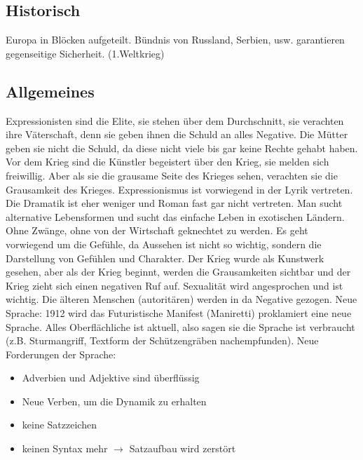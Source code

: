 \documentclass[12pt,a4paper]{article}
\begin{document}
\subsection{Historisch}

Europa in Blöcken aufgeteilt. Bündnis von Russland, Serbien, usw. garantieren gegenseitige Sicherheit. (1.Weltkrieg)

\subsection{Allgemeines}

Expressionisten sind die Elite, sie stehen über dem Durchschnitt, sie verachten ihre Väterschaft, denn sie geben ihnen die Schuld an alles Negative. Die Mütter geben sie nicht die Schuld, da diese nicht viele bis gar keine Rechte gehabt haben. 
\newline
Vor dem Krieg sind die Künstler begeistert über den Krieg, sie melden sich freiwillig. Aber als sie die grausame Seite des Krieges sehen, verachten sie die Grausamkeit des Krieges. 
\newline
Expressionismus ist vorwiegend in der Lyrik vertreten. Die Dramatik ist eher weniger und Roman fast gar nicht vertreten. Man sucht alternative Lebensformen und sucht das einfache Leben in exotischen Ländern. Ohne Zwänge, ohne von der Wirtschaft geknechtet zu werden. Es geht vorwiegend um die Gefühle, da Aussehen ist nicht so wichtig, sondern die Darstellung von Gefühlen und Charakter.
\newline
\newline
Der Krieg wurde als Kunstwerk gesehen, aber als der Krieg beginnt, werden die Grausamkeiten sichtbar und der Krieg zieht sich einen negativen Ruf auf. Sexualität wird angesprochen und ist wichtig. Die älteren Menschen (autoritären) werden in da 
Negative gezogen.
\newline
\newline
Neue Sprache: 1912 wird das Futuristische Manifest (Maniretti) proklamiert eine neue Sprache. Alles Oberflächliche ist aktuell, also sagen sie die Sprache ist verbraucht (z.B. Sturmangriff, Textform der Schützengräben nachempfunden). 
\newline
\newline
Neue Forderungen der Sprache:

\begin{itemize}

\item Adverbien und Adjektive sind überflüssig
\item Neue Verben, um die Dynamik zu erhalten
\item keine Satzzeichen
\item keinen Syntax mehr $\rightarrow$ Satzaufbau wird zerstört

\end{itemize}
\end{document}
